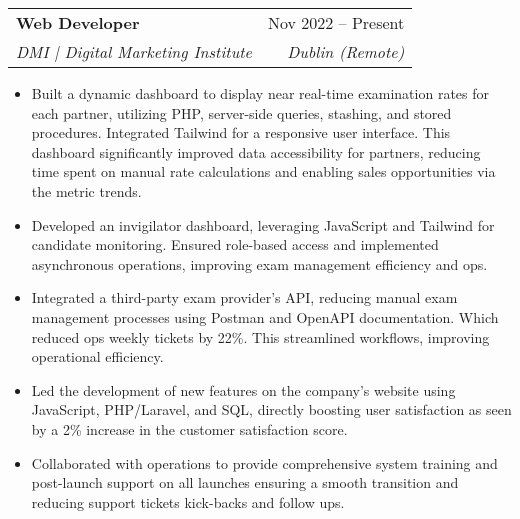 \documentclass[letterpaper,11pt]{article}
\makeatletter
\newcommand{\resumeItem}[1]{
  \item\small{
    {#1 \vspace{-2pt}}
  }
}
\newcommand{\resumeSubheading}[4]{
  \vspace{-2pt}\item
    \begin{tabular*}{0.97\textwidth}[t]{l@{\extracolsep{\fill}}r}
      \textbf{#1} & #2 \\
      \textit{\small#3} & \textit{\small #4} \\
    \end{tabular*}\vspace{-7pt}
}
\newcommand{\resumeSubSubheading}[2]{
    \item
    \begin{tabular*}{0.97\textwidth}{l@{\extracolsep{\fill}}r}
      \textit{\small#1} & \textit{\small #2} \\
    \end{tabular*}\vspace{-7pt}
}
\newcommand{\resumeSubHeadingListEnd}{\end{itemize}}
\newcommand{\resumeItemListStart}{\begin{itemize}}
\newcommand{\resumeItemListEnd}{\end{itemize}\vspace{-5pt}}
\makeatother
\begin{document}
    \resumeSubheading
      {Web Developer}{Nov 2022 -- Present}
      {DMI | Digital Marketing Institute}{Dublin (Remote)}
      \resumeItemListStart
      \resumeItem{Built a dynamic dashboard to display near real-time examination rates for each partner, utilizing PHP, server-side queries, stashing, and stored procedures. 
      Integrated Tailwind for a responsive user interface. This dashboard significantly improved data accessibility for partners, reducing time spent on manual rate calculations and enabling sales opportunities via the metric trends.}
      \resumeItem{Developed an invigilator dashboard, leveraging JavaScript and Tailwind for candidate monitoring. Ensured role-based access and implemented asynchronous operations, improving exam management efficiency and ops.}
        \resumeItem{Integrated a third-party exam provider's API, reducing manual exam management processes using Postman and OpenAPI documentation. Which reduced ops weekly tickets by 22\%. This streamlined workflows, improving operational efficiency.}
        \resumeItem{Led the development of new features on the company’s website using JavaScript, PHP/Laravel, and SQL, directly boosting user satisfaction as seen by a 2\% increase in the customer satisfaction score.}
        \resumeItem{Collaborated with operations to provide comprehensive system training and post-launch support on all launches ensuring a smooth transition and reducing support tickets kick-backs and follow ups.}
        \linebreak[4]
      \resumeItemListEnd
      
\end{document}
